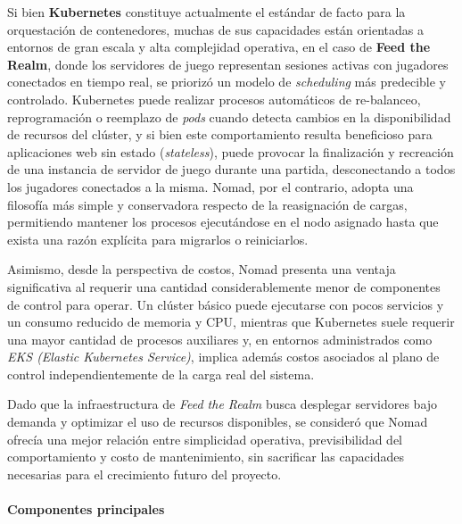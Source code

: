 Si bien \textbf{Kubernetes} constituye actualmente el estándar de facto para la orquestación de contenedores, muchas de sus capacidades están orientadas a entornos
de gran escala y alta complejidad operativa, en el caso de \textbf{Feed the Realm}, donde los servidores de juego representan sesiones activas con jugadores conectados
en tiempo real, se priorizó un modelo de \textit{scheduling} más predecible y controlado.
Kubernetes puede realizar procesos automáticos de re-balanceo, reprogramación o reemplazo de \textit{pods} cuando detecta cambios en la disponibilidad de recursos del clúster, y
si bien este comportamiento resulta beneficioso para aplicaciones web sin estado (\textit{stateless}), puede provocar la finalización y recreación 
de una instancia de servidor de juego durante una partida, desconectando a todos los jugadores conectados a la misma.
Nomad, por el contrario, adopta una filosofía más simple y conservadora respecto de la reasignación de cargas, permitiendo mantener los procesos ejecutándose 
en el nodo asignado hasta que exista una razón explícita para migrarlos o reiniciarlos.

Asimismo, desde la perspectiva de costos, Nomad presenta una ventaja significativa al requerir una cantidad considerablemente menor de componentes de control para operar.
Un clúster básico puede ejecutarse con pocos servicios y un consumo reducido de memoria y CPU, mientras que Kubernetes suele requerir una mayor cantidad de procesos 
auxiliares y, en entornos administrados como \textit{EKS (Elastic Kubernetes Service)}, implica además costos asociados al plano de control independientemente 
de la carga real del sistema.

Dado que la infraestructura de \textit{Feed the Realm} busca desplegar servidores bajo demanda y optimizar el uso de recursos disponibles,
se consideró que Nomad ofrecía una mejor relación entre simplicidad operativa, previsibilidad del comportamiento y costo de mantenimiento, sin sacrificar las capacidades 
necesarias para el crecimiento futuro del proyecto.

\paragraph{Componentes principales}

